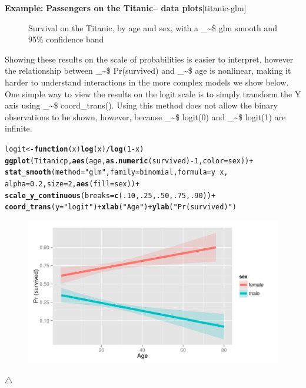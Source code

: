 \documentclass{article}
\makeatletter
\newcommand{\hlnum}[1]{\textcolor[rgb]{0.686,0.059,0.569}{#1}}%
\newcommand{\hlstr}[1]{\textcolor[rgb]{0.192,0.494,0.8}{#1}}%
\newcommand{\hlopt}[1]{\textcolor[rgb]{0,0,0}{#1}}%
\newcommand{\hlstd}[1]{\textcolor[rgb]{0.345,0.345,0.345}{#1}}%
\newcommand{\hlkwa}[1]{\textcolor[rgb]{0.161,0.373,0.58}{\textbf{#1}}}%
\newcommand{\hlkwb}[1]{\textcolor[rgb]{0.69,0.353,0.396}{#1}}%
\newcommand{\hlkwc}[1]{\textcolor[rgb]{0.333,0.667,0.333}{#1}}%
\newcommand{\hlkwd}[1]{\textcolor[rgb]{0.737,0.353,0.396}{\textbf{#1}}}%
\newenvironment{kframe}{%
 \def\at@end@of@kframe{}%
 \ifinner\ifhmode%
  \def\at@end@of@kframe{\end{minipage}}%
  \begin{minipage}{\columnwidth}%
 \fi\fi%
 \def\FrameCommand##1{\hskip\@totalleftmargin \hskip-\fboxsep
 \colorbox{shadecolor}{##1}\hskip-\fboxsep
     \hskip-\linewidth \hskip-\@totalleftmargin \hskip\columnwidth}%
 \MakeFramed {\advance\hsize-\width
   \@totalleftmargin\z@ \linewidth\hsize
   \@setminipage}}%
 {\par\unskip\endMakeFramed%
 \at@end@of@kframe}
\newenvironment{knitrout}{}{} %
\newcommand\code{\bgroup\@makeother\_\@makeother\~\@makeother\$\@codex}
\def\@codex#1{{\normalfont\ttfamily\hyphenchar\font=-1 #1}\egroup}
\newcommand{\func}[1]{\code{#1()}}
\newenvironment{Example}[2][unnamed-example]%
  {\medskip\noindent\textbf{\textsf{Example:}}
   \textbf{#2}\hfill [#1]\par\smallskip
  }
  {\hfill $\triangle$}
\makeatother
\begin{document}
\begin{Example}[titanic-glm]{Passengers on the Titanic-- data plots}
\begin{knitrout}
\begin{figure}[hb]
{}

\caption[Survival on the Titanic, by age and sex, with a \code{glm} smooth and 95\% confidence band]{Survival on the Titanic, by age and sex, with a \code{glm} smooth and 95\% confidence band\label{fig:titanic-glm-ggp2}}
\end{figure}


\end{knitrout}


Showing these results on the scale of probabilities is easier to interpret,
however the relationship between \code{Pr(survived)} and \code{age}
is nonlinear, making it harder to understand interactions in the
more complex models we show below.  One simple way to view the results
on the logit scale is to simply transform the Y axis using
\func{coord\_trans}.  Using this method does not allow the binary observations
to be shown, however, because \code{logit(0)} and \code{logit(1)} are infinite.
\begin{knitrout}
\color{fgcolor}\begin{kframe}
\begin{alltt}
\hlstd{logit} \hlkwb{<-} \hlkwa{function}\hlstd{(}\hlkwc{x}\hlstd{)} \hlkwd{log}\hlstd{(x)}\hlopt{/}\hlkwd{log}\hlstd{(}\hlnum{1}\hlopt{-}\hlstd{x)}
\hlkwd{ggplot}\hlstd{(Titanicp,} \hlkwd{aes}\hlstd{(age,} \hlkwd{as.numeric}\hlstd{(survived)}\hlopt{-}\hlnum{1}\hlstd{,} \hlkwc{color}\hlstd{=sex))} \hlopt{+}
  \hlkwd{stat_smooth}\hlstd{(}\hlkwc{method}\hlstd{=}\hlstr{"glm"}\hlstd{,} \hlkwc{family}\hlstd{=binomial,} \hlkwc{formula}\hlstd{=y}\hlopt{~}\hlstd{x,}
              \hlkwc{alpha}\hlstd{=}\hlnum{0.2}\hlstd{,} \hlkwc{size}\hlstd{=}\hlnum{2}\hlstd{,} \hlkwd{aes}\hlstd{(}\hlkwc{fill}\hlstd{=sex))} \hlopt{+}
  \hlkwd{scale_y_continuous}\hlstd{(}\hlkwc{breaks}\hlstd{=}\hlkwd{c}\hlstd{(}\hlnum{.10}\hlstd{,} \hlnum{.25}\hlstd{,} \hlnum{.50}\hlstd{,} \hlnum{.75}\hlstd{,} \hlnum{.90}\hlstd{))} \hlopt{+}
  \hlkwd{coord_trans}\hlstd{(}\hlkwc{y}\hlstd{=}\hlstr{"logit"}\hlstd{)} \hlopt{+} \hlkwd{xlab}\hlstd{(}\hlstr{"Age"}\hlstd{)} \hlopt{+} \hlkwd{ylab}\hlstd{(}\hlstr{"Pr (survived)"}\hlstd{)}
\end{alltt}
\end{kframe}\begin{figure}[hb]


{\centering \includegraphics[width=.6\linewidth]{figure/titanic-glm-ggp-logit} 

}
\end{figure}
\end{knitrout}
\end{Example}
\end{document}
